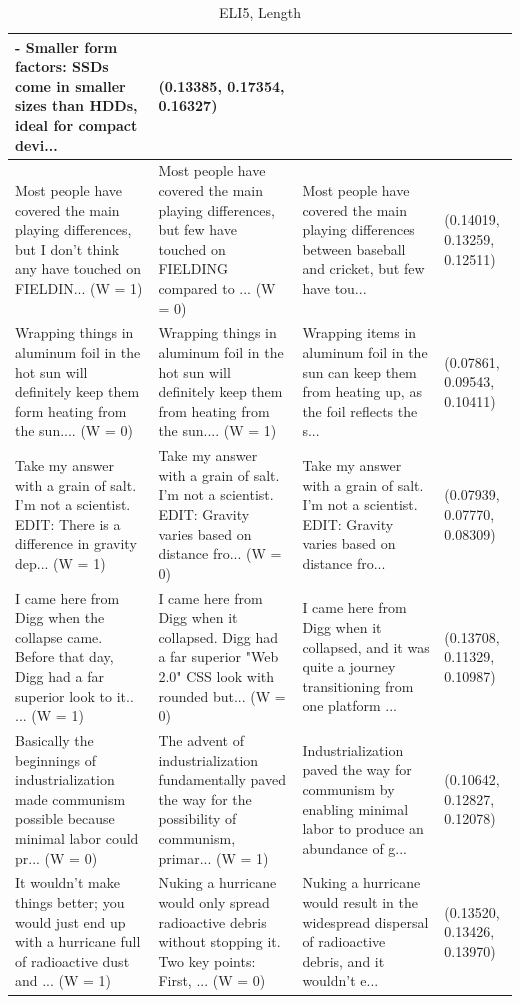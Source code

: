 \documentclass{article}
\begin{document}
\begin{table}[H]
\begin{tabular}{|p{}|p{}|p{}|p{}|}
  - Smaller form factors: SSDs come in smaller sizes than HDDs, ideal for compact devi... & (0.13385, 0.17354, 0.16327) \\ \hline
  Most people have covered the main playing differences, but I don't think any have touched on FIELDIN... (W = 1) & Most people have covered the main playing differences, but few have touched on FIELDING compared to ... (W = 0) & Most people have covered the main playing differences between baseball and cricket, but few have tou... & (0.14019, 0.13259, 0.12511) \\ \hline
  Wrapping things in aluminum foil in the hot sun will definitely keep them form heating from the sun.... (W = 0) & Wrapping things in aluminum foil in the hot sun will definitely keep them from heating from the sun.... (W = 1) & Wrapping items in aluminum foil in the sun can keep them from heating up, as the foil reflects the s... & (0.07861, 0.09543, 0.10411) \\ \hline
  Take my answer with a grain of salt. I'm not a scientist. EDIT: There is a difference in gravity dep... (W = 1) & Take my answer with a grain of salt. I'm not a scientist. EDIT: Gravity varies based on distance fro... (W = 0) & Take my answer with a grain of salt. I'm not a scientist. EDIT: Gravity varies based on distance fro... & (0.07939, 0.07770, 0.08309) \\ \hline
  I came here from Digg when the collapse came. Before that day, Digg had a far superior look to it.. ... (W = 1) & I came here from Digg when it collapsed. Digg had a far superior "Web 2.0" CSS look with rounded but... (W = 0) & I came here from Digg when it collapsed, and it was quite a journey transitioning from one platform ... & (0.13708, 0.11329, 0.10987) \\ \hline
  Basically the beginnings of industrialization made communism possible because minimal labor could pr... (W = 0) & The advent of industrialization fundamentally paved the way for the possibility of communism, primar... (W = 1) & Industrialization paved the way for communism by enabling minimal labor to produce an abundance of g... & (0.10642, 0.12827, 0.12078) \\ \hline
  It wouldn't make things better; you would just end up with a hurricane full of radioactive dust and ... (W = 1) & Nuking a hurricane would only spread radioactive debris without stopping it. Two key points: First, ... (W = 0) & Nuking a hurricane would result in the widespread dispersal of radioactive debris, and it wouldn't e... & (0.13520, 0.13426, 0.13970) \\ \hline
  \end{tabular}
  \caption{ELI5, Length}
\end{table}
\end{document}
